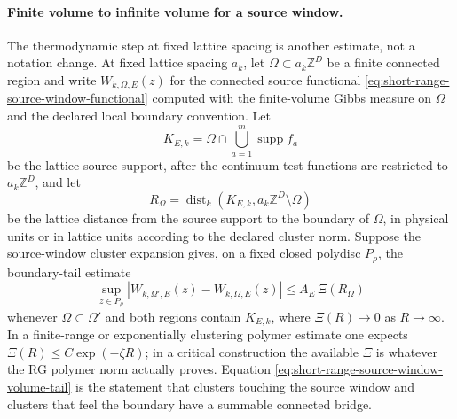 \paragraph{Finite volume to infinite volume for a source window.}
The thermodynamic step at fixed lattice spacing is another estimate, not a
notation change.  At fixed lattice spacing \(a_k\), let
\(\Omega\subset a_k\mathbb Z^D\) be a finite connected region and write
\(W_{k,\Omega,E}(z)\) for the connected source functional
\eqref{eq:short-range-source-window-functional} computed with the
finite-volume Gibbs measure on \(\Omega\) and the declared local boundary
convention.  Let
\[
  K_{E,k}
  =
  \Omega\cap
  \bigcup_{a=1}^m \operatorname{supp} f_a
\]
be the lattice source support, after the continuum test functions are
restricted to \(a_k\mathbb Z^D\), and let
\[
  R_\Omega=\operatorname{dist}_k(K_{E,k},a_k\mathbb Z^D\setminus\Omega)
\]
be the lattice distance from the source support to the boundary of
\(\Omega\), in physical units or in lattice units according to the declared
cluster norm.  Suppose the source-window cluster expansion gives, on a fixed
closed polydisc \(P_\rho\), the boundary-tail estimate
\begin{equation}
  \sup_{z\in P_\rho}
  |W_{k,\Omega',E}(z)-W_{k,\Omega,E}(z)|
  \leq
  A_E\,\Xi(R_\Omega)
  \label{eq:short-range-source-window-volume-tail}
\end{equation}
whenever \(\Omega\subset\Omega'\) and both regions contain \(K_{E,k}\), where
\(\Xi(R)\to0\) as \(R\to\infty\).  In a finite-range or exponentially
clustering polymer estimate one expects
\(\Xi(R)\le C\exp(-\zeta R)\); in a critical construction the available
\(\Xi\) is whatever the RG polymer norm actually proves.  Equation
\eqref{eq:short-range-source-window-volume-tail} is the statement that
clusters touching the source window and clusters that feel the boundary have
a summable connected bridge.


